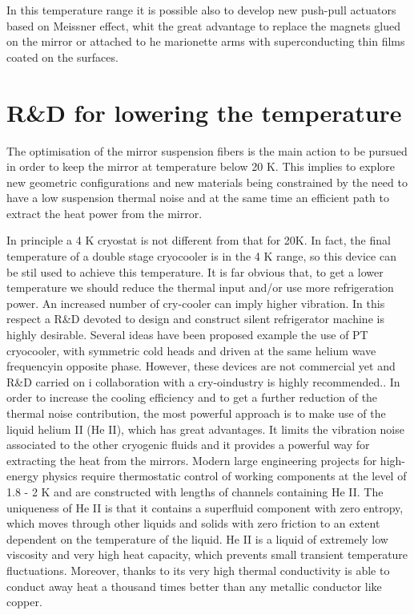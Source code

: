 In this temperature range it is possible also  to develop new push-pull actuators based on Meissner effect, whit the great advantage to replace the magnets glued on the mirror or attached to he marionette arms with superconducting thin films coated on the surfaces. 


\section{R\&D for lowering the temperature}
The optimisation of the mirror suspension fibers is the  main action to be pursued in order to keep the mirror at temperature below 20 K.
This implies to explore new geometric configurations  and new materials being constrained by the need  to have a low suspension thermal noise and at the same time an efficient path to extract the heat power from the mirror. 

In principle a 4 K cryostat is not  different from that for 20K.  In fact, the final temperature of a double stage cryocooler is in the 4 K  range, so   this device  can be stil used to  achieve this temperature.  It is far obvious that, to get a lower temperature we should reduce the thermal input and/or  use more refrigeration power. An increased number of cry-cooler can imply higher vibration.  In this respect a R\&D   devoted to design and construct  silent refrigerator machine is highly desirable. 
Several ideas have been proposed   example the use of PT cryocooler, with symmetric cold heads and   driven  at the same helium wave frequencyin  opposite phase. However, these devices are not commercial yet and R\&D carried on i collaboration with a cry-oindustry is highly recommended..
 In order to increase the cooling efficiency and to get a further reduction of the thermal noise contribution, the most powerful approach is to make use of the liquid helium II (He II), which has great advantages. It limits the vibration noise associated to the other cryogenic fluids  and it provides a powerful way for extracting the heat from the mirrors. Modern large engineering projects for high-energy physics require thermostatic control of working components at the level of 1.8 - 2 K and are constructed with lengths of channels containing He II. The uniqueness of He II is that it contains a superfluid component with zero entropy, which moves through other liquids and solids with zero friction to an extent dependent on the temperature of the liquid. He II is a liquid of extremely low viscosity and very high heat capacity, which prevents small transient temperature fluctuations. Moreover, thanks to its very high thermal conductivity is able to conduct away heat a thousand times better than any metallic conductor like copper.

